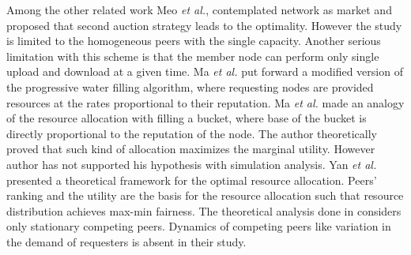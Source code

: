 \documentclass[journal]{IEEEtran}
\begin{document}
Among the other related work \cite{Meo} Meo \emph{et al.}, contemplated network as market and proposed that second auction strategy leads to the optimality. However the study is limited to the homogeneous peers with the single capacity. Another serious limitation with this scheme is that the member node can perform only single upload and download at a given time. Ma \emph{et al.} \cite{MaKiGame} put forward a modified version of the progressive water filling algorithm, where requesting nodes are provided resources at the rates proportional to their reputation. Ma \emph{et al.} made an analogy of the resource allocation with filling a bucket, where base of the bucket is directly proportional to the reputation of the node. The author theoretically  proved that such kind of allocation maximizes the marginal utility. However author has not supported his hypothesis with simulation analysis. Yan \emph{et al.} \cite{Yan} presented a theoretical framework for the optimal resource allocation. Peers' ranking and the utility are the basis for the resource allocation such that resource distribution achieves max-min fairness. The theoretical analysis done in  \cite{MaKiGame}\cite{Yan} considers only stationary competing peers. Dynamics of competing peers like variation in the demand of requesters is absent in their study.
\end{document}
